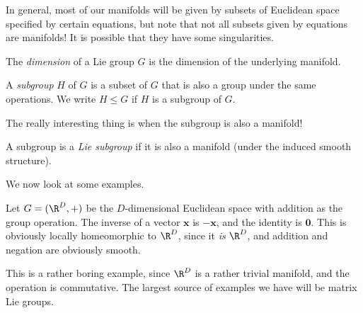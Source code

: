 \documentclass[a4paper]{article}
\begin{document}
In general, most of our manifolds will be given by subsets of Euclidean space specified by certain equations, but note that not all subsets given by equations are manifolds! It is possible that they have some singularities.

\begin{defi}
  The \emph{dimension} of a Lie group $G$ is the dimension of the underlying manifold.
\end{defi}

\begin{defi}[Subgroup]
  A \emph{subgroup} $H$ of $G$ is a subset of $G$ that is also a group under the same operations. We write $H \leq G$ if $H$ is a subgroup of $G$.
\end{defi}

The really interesting thing is when the subgroup is also a manifold!
\begin{defi}
  A subgroup is a \emph{Lie subgroup} if it is also a manifold (under the induced smooth structure).
\end{defi}

%
%

We now look at some examples.
\begin{eg}
  Let $G = (\R^D, +)$ be the $D$-dimensional Euclidean space with addition as the group operation. The inverse of a vector $\mathbf{x}$ is $-\mathbf{x}$, and the identity is $\mathbf{0}$. This is obviously locally homeomorphic to $\R^D$, since it \emph{is} $\R^D$, and addition and negation are obviously smooth.
\end{eg}

This is a rather boring example, since $\R^D$ is a rather trivial manifold, and the operation is commutative. The largest source of examples we have will be matrix Lie groups.
\end{document}
